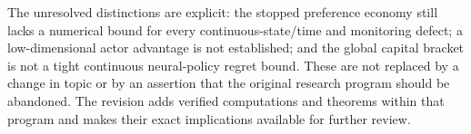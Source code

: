 The unresolved distinctions are explicit: the stopped preference economy still lacks a numerical bound for every continuous-state/time and monitoring defect; a low-dimensional actor advantage is not established; and the global capital bracket is not a tight continuous neural-policy regret bound. These are not replaced by a change in topic or by an assertion that the original research program should be abandoned. The revision adds verified computations and theorems within that program and makes their exact implications available for further review.
